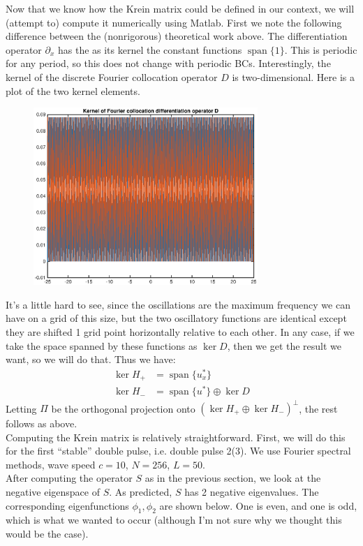 \documentclass[12pt]{article}
\DeclareMathOperator{\spn}{span}
\begin{document}
Now that we know how the Krein matrix could be defined in our context, we will (attempt to) compute it numerically using Matlab. First we note the following difference between the (nonrigorous) theoretical work above. The differentiation operator $\partial_x$ has the as its kernel the constant functions $\spn \{1 \}$. This is periodic for any period, so this does not change with periodic BCs. Interestingly, the kernel of the discrete Fourier collocation operator $D$ is two-dimensional. Here is a plot of the two kernel elements.

\begin{figure}[H]
	\includegraphics[width=8.5cm]{kerD}
\end{figure}

It's a little hard to see, since the oscillations are the maximum frequency we can have on a grid of this size, but the two oscillatory functions are identical except they are shifted 1 grid point horizontally relative to each other. In any case, if we take the space spanned by these functions as $\ker D$, then we get the result we want, so we will do that. Thus we have:
\begin{align}
\ker H_+ &= \spn \{ u^*_x \} \\
\ker H_- &= \spn \{u^*\} \oplus \ker D
\end{align}
Letting $\Pi$ be the orthogonal projection onto $(\ker H_+ \oplus \ker H_-)^\perp$, the rest follows as above.\\

Computing the Krein matrix is relatively straightforward. First, we will do this for the first ``stable'' double pulse, i.e. double pulse 2(3). We use Fourier spectral methods, wave speed $c = 10$, $N = 256$, $L = 50$. \\

After computing the operator $S$ as in the previous section, we look at the negative eigenspace of $S$. As predicted, $S$ has 2 negative eigenvalues. The corresponding eigenfunctions $\phi_1, \phi_2$ are shown below. One is even, and one is odd, which is what we wanted to occur (although I'm not sure why we thought this would be the case).
\end{document}
